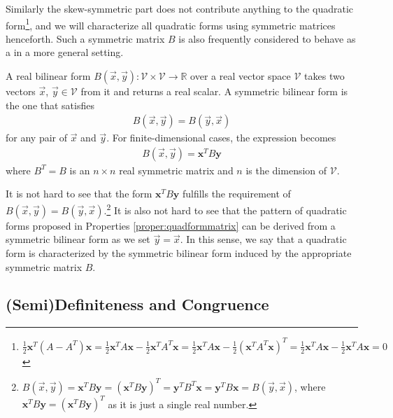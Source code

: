 Similarly the skew-symmetric part does not contribute anything to the quadratic form\footnote{$\frac{1}{2}\textbf{x}^T(A - A^T)\textbf{x} = \frac{1}{2}\textbf{x}^TA\textbf{x} - \frac{1}{2}\textbf{x}^TA^T\textbf{x} = \frac{1}{2}\textbf{x}^TA\textbf{x} - \frac{1}{2}(\textbf{x}^TA^T\textbf{x})^T = \frac{1}{2}\textbf{x}^TA\textbf{x} - \frac{1}{2}\textbf{x}^TA\textbf{x} = 0$}, and we will characterize all quadratic forms using symmetric matrices henceforth.
Such a symmetric matrix $B$ is also frequently considered to behave as a  in a more general setting.
\begin{defn}
A real bilinear form $B(\vec{x}, \vec{y}): \mathcal{V} \times \mathcal{V} \to \mathbb{R}$ over a real vector space $\mathcal{V}$ takes two vectors $\vec{x}$, $\vec{y} \in \mathcal{V}$ from it and returns a real scalar. A symmetric bilinear form is the one that satisfies 
\begin{align}
B(\vec{x}, \vec{y}) = B(\vec{y}, \vec{x})    
\end{align} for any pair of $\vec{x}$ and $\vec{y}$. For finite-dimensional cases, the expression becomes
\begin{align}
B(\vec{x}, \vec{y}) = \textbf{x}^T B \textbf{y}    
\end{align}
where $B^T = B$ is an $n \times n$ real symmetric matrix and $n$ is the dimension of $\mathcal{V}$.
\end{defn}
It is not hard to see that the form $\textbf{x}^TB\textbf{y}$ fulfills the requirement of $B(\vec{x}, \vec{y}) = B(\vec{y}, \vec{x})$.\footnote{$B(\vec{x}, \vec{y}) = \textbf{x}^TB\textbf{y} = (\textbf{x}^TB\textbf{y})^T = \textbf{y}^TB^T\textbf{x} = \textbf{y}^TB\textbf{x} = B(\vec{y}, \vec{x})$, where $\textbf{x}^TB\textbf{y} = (\textbf{x}^TB\textbf{y})^T$ as it is just a single real number.} It is also not hard to see that the pattern of quadratic forms proposed in Properties \ref{proper:quadformmatrix} can be derived from a symmetric bilinear form as we set $\vec{y} = \vec{x}$. In this sense, we say that a quadratic form is characterized by the symmetric bilinear form induced by the appropriate symmetric matrix $B$.

\subsection{(Semi)Definiteness and Congruence}
\label{subsection:definiteness}

